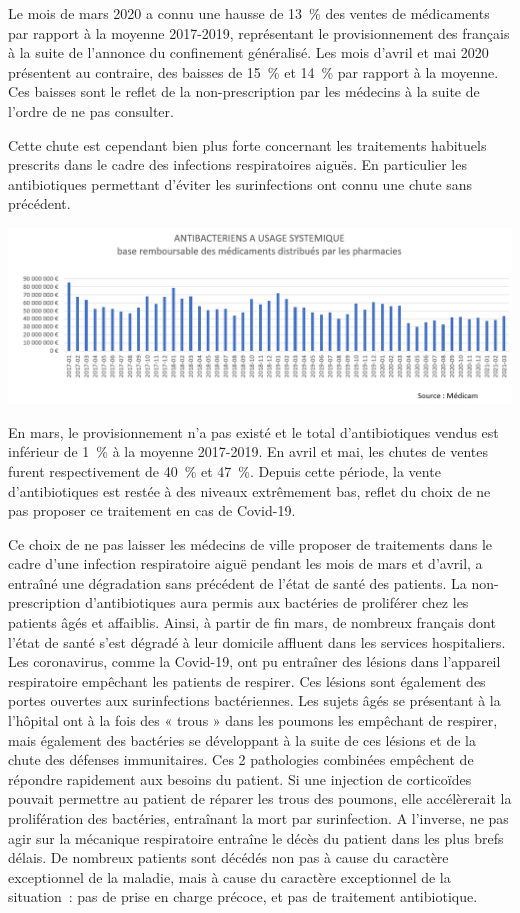 \documentclass[
]{article}
\begin{document}
Le mois de mars 2020 a connu une hausse de 13~\% des ventes de
médicaments par rapport à la moyenne 2017-2019, représentant le
provisionnement des français à la suite de l'annonce du confinement
généralisé. Les mois d'avril et mai 2020 présentent au contraire, des
baisses de 15~\% et 14~\% par rapport à la moyenne. Ces baisses sont le
reflet de la non-prescription par les médecins à la suite de l'ordre de
ne pas consulter.

Cette chute est cependant bien plus forte concernant les traitements
habituels prescrits dans le cadre des infections respiratoires aiguës.
En particulier les antibiotiques permettant d'éviter les surinfections
ont connu une chute sans précédent.

\includegraphics[width=10.41667in,height=\textheight]{data/images/medicbac.png}

En mars, le provisionnement n'a pas existé et le total d'antibiotiques
vendus est inférieur de 1~\% à la moyenne 2017-2019. En avril et mai,
les chutes de ventes furent respectivement de 40~\% et 47~\%. Depuis
cette période, la vente d'antibiotiques est restée à des niveaux
extrêmement bas, reflet du choix de ne pas proposer ce traitement en cas
de Covid-19.

Ce choix de ne pas laisser les médecins de ville proposer de traitements
dans le cadre d'une infection respiratoire aiguë pendant les mois de
mars et d'avril, a entraîné une dégradation sans précédent de l'état de
santé des patients. La non-prescription d'antibiotiques aura permis aux
bactéries de proliférer chez les patients âgés et affaiblis. Ainsi, à
partir de fin mars, de nombreux français dont l'état de santé s'est
dégradé à leur domicile affluent dans les services hospitaliers. Les
coronavirus, comme la Covid-19, ont pu entraîner des lésions dans
l'appareil respiratoire empêchant les patients de respirer. Ces lésions
sont également des portes ouvertes aux surinfections bactériennes. Les
sujets âgés se présentant à la l'hôpital ont à la fois des « trous »
dans les poumons les empêchant de respirer, mais également des bactéries
se développant à la suite de ces lésions et de la chute des défenses
immunitaires. Ces 2 pathologies combinées empêchent de répondre
rapidement aux besoins du patient. Si une injection de corticoïdes
pouvait permettre au patient de réparer les trous des poumons, elle
accélèrerait la prolifération des bactéries, entraînant la mort par
surinfection. A l'inverse, ne pas agir sur la mécanique respiratoire
entraîne le décès du patient dans les plus brefs délais. De nombreux
patients sont décédés non pas à cause du caractère exceptionnel de la
maladie, mais à cause du caractère exceptionnel de la situation~: pas de
prise en charge précoce, et pas de traitement antibiotique.
\end{document}

